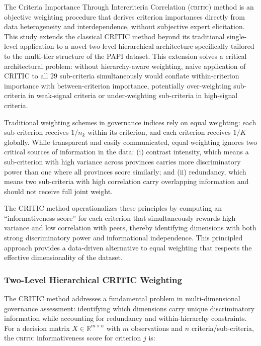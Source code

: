 \documentclass[12pt,a4paper]{article}
\newcommand{\CRITIC}{\textsc{critic}\xspace}
\begin{document}

The Criteria Importance Through Intercriteria Correlation (\CRITIC) method \citep{Diakoulaki1995} is an objective weighting procedure that derives criterion importances directly from data heterogeneity and interdependence, without subjective expert elicitation. This study extends the classical CRITIC method beyond its traditional single-level application to a novel two-level hierarchical architecture specifically tailored to the multi-tier structure of the PAPI dataset. This extension solves a critical architectural problem: without hierarchy-aware weighting, naive application of CRITIC to all 29 sub-criteria simultaneously would conflate within-criterion importance with between-criterion importance, potentially over-weighting sub-criteria in weak-signal criteria or under-weighting sub-criteria in high-signal criteria.

Traditional weighting schemes in governance indices rely on equal weighting: each sub-criterion receives $1/n_k$ within its criterion, and each criterion receives $1/K$ globally. While transparent and easily communicated, equal weighting ignores two critical sources of information in the data: (i) contrast intensity, which means a sub-criterion with high variance across provinces carries more discriminatory power than one where all provinces score similarly; and (ii) redundancy, which means two sub-criteria with high correlation carry overlapping information and should not receive full joint weight.

The CRITIC method operationalizes these principles by computing an ``informativeness score'' for each criterion that simultaneously rewards high variance and low correlation with peers, thereby identifying dimensions with both strong discriminatory power and informational independence. This principled approach provides a data-driven alternative to equal weighting that respects the effective dimensionality of the dataset.

\subsubsection{Two-Level Hierarchical CRITIC Weighting}

The CRITIC method addresses a fundamental problem in multi-dimensional governance assessment: identifying which dimensions carry unique discriminatory information while accounting for redundancy and within-hierarchy constraints. For a decision matrix $X \in \mathbb{R}^{m \times n}$ with $m$ observations and $n$ criteria/sub-criteria, the \CRITIC informativeness score for criterion $j$ is:
\end{document}
